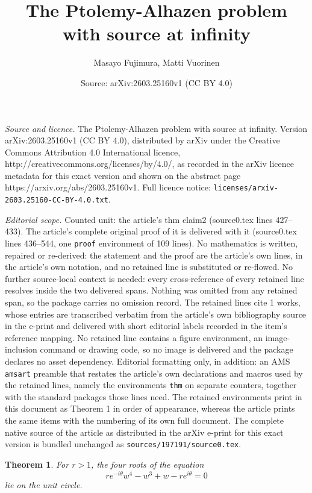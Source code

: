 \documentclass[10pt,a4paper]{amsart}
\title{The Ptolemy-Alhazen problem with source at infinity}
\author{Masayo Fujimura, Matti Vuorinen}
\date{Source: arXiv:2603.25160v1 (CC BY 4.0)}
\newtheorem{thm}{Theorem}
\begin{document}
\maketitle

\noindent\emph{Source and licence.} The Ptolemy-Alhazen problem with source at infinity. Version arXiv:2603.25160v1 (CC BY 4.0), distributed by arXiv under the Creative Commons Attribution 4.0 International licence, http://creativecommons.org/licenses/by/4.0/, as recorded in the arXiv licence metadata for this exact version and shown on the abstract page https://arxiv.org/abs/2603.25160v1. Full licence notice: \texttt{licenses/arxiv-2603.25160-CC-BY-4.0.txt}.\par\smallskip

\noindent\textit{Editorial scope.} Counted unit: the article's thm claim2 (source0.tex lines 427--433). The article's complete original proof of it is delivered with it (source0.tex lines 436--544, one \texttt{proof} environment of 109 lines). No mathematics is written, repaired or re-derived: the statement and the proof are the article's own lines, in the article's own notation, and no retained line is substituted or re-flowed.  No further source-local context is needed: every cross-reference of every retained line resolves inside the two delivered spans.  Nothing was omitted from any retained span, so the package carries no omission record.  The retained lines cite 1 works, whose entries are transcribed verbatim from the article's own bibliography source in the e-print and delivered with short editorial labels recorded in the item's reference mapping.  No retained line contains a figure environment, an image-inclusion command or drawing code, so no image is delivered and the package declares no asset dependency.  Editorial formatting only, in addition: an AMS \texttt{amsart} preamble that restates the article's own declarations and macros used by the retained lines, namely the environments \texttt{thm} on separate counters, together with the standard packages those lines need.  The retained environments print in this document as Theorem 1 in order of appearance, whereas the article prints the same items with the numbering of its own full document.  The complete native source of the article as distributed in the arXiv e-print for this exact version is bundled unchanged as \texttt{sources/197191/source0.tex}.
\begin{thm}\label{claim2}
For $ r>1 $, the four roots of the equation 
\begin{equation}\label{eq:inf}
  re^{-i\theta}w^4-w^3+w-re^{i\theta}=0
\end{equation}
lie on the unit circle.
\end{thm}
\end{document}
